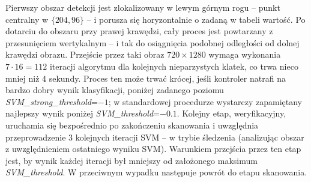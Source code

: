 Pierwszy obszar detekcji jest zlokalizowany w lewym górnym rogu -- punkt centralny w $\{204,96\}$ -- i porusza się horyzontalnie o zadaną w tabeli wartość. %
Po dotarciu do obszaru przy prawej krawędzi, cały proces jest powtarzany z przesunięciem wertykalnym -- i tak do osiągnięcia podobnej odległości od dolnej krawędzi obrazu. %
Przejście przez taki obraz $720\times 1280$ wymaga wykonania $7\cdot16=112$ iteracji algorytmu dla kolejnych nieparzystych klatek, co trwa nieco mniej niż 4 sekundy. %
Proces ten może trwać krócej, jeśli kontroler natrafi na bardzo dobry wynik klasyfikacji, poniżej zadanego poziomu \textit{SVM\_strong\_threshold}=$-1$; w standardowej procedurze wystarczy zapamiętany najlepszy wynik poniżej \textit{SVM\_threshold}=$-0.1$. %
Kolejny etap, weryfikacyjny, uruchamia się bezpośrednio po zakończeniu skanowania i uwzględnia przeprowadzenie 3 kolejnych iteracji SVM -- w trybie śledzenia (analizując obszar z uwzględnieniem ostatniego wyniku SVM). %
Warunkiem przejścia przez ten etap jest, by wynik każdej iteracji był mniejszy od założonego maksimum \textit{SVM\_threshold}. 
W przeciwnym wypadku następuje powrót do etapu skanowania. 


